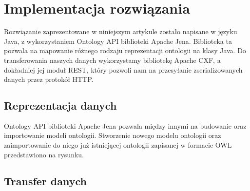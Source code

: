 \section{Implementacja rozwiązania}
\label{cha:impl}

Rozwiązanie zaprezentowane w niniejszym artykule zostało napisane w języku Java, z wykorzystaniem Ontology API biblioteki Apache Jena. Biblioteka ta pozwala na mapowanie różnego rodzaju reprezentacji ontologii na klasy Java. Do transferowania naszych danych wykorzystamy bibliotekę Apache CXF, a dokładniej jej moduł REST, który pozwoli nam na przesyłanie zserializowanych danych przez protokół HTTP.

\subsection{Reprezentacja danych}
\label{sec:persist}

Ontology API biblioteki Apache Jena pozwala między innymi na budowanie oraz importowanie modeli ontologii. Stworzenie nowego modelu ontologii oraz zaimportowanie do niego już istniejącej ontologii zapisanej w formacie OWL przedstawiono na rysunku.

\subsection{Transfer danych}
\label{sec:transfer}